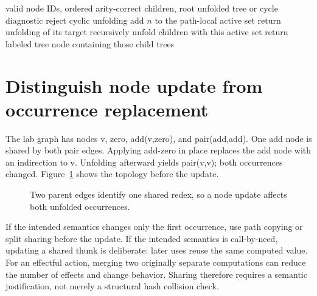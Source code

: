 \begin{algorithm}[htbp]
\caption{Read back a finite acyclic term graph, rejecting cyclic tree unfolding.}
\label{alg:ch86-unfold}
\begin{pseudocode}
\Require valid node IDs, ordered arity-correct children, root
\Ensure unfolded tree or cycle diagnostic
 \State reject cyclic unfolding \EndIf
\State add $n$ to the path-local active set
 \State return unfolding of its target \EndIf
\State recursively unfold children with this active set
\State return labeled tree node containing those child trees
\EndFunction
\end{pseudocode}
\end{algorithm}

\section{Distinguish node update from occurrence replacement}
\label{sec:ch86-update}
The lab graph has nodes v, zero, add(v,zero), and pair(add,add).
One add node is shared by both pair edges.
Applying add-zero in place replaces the add node with an indirection to v.
Unfolding afterward yields pair(v,v); both occurrences changed.
Figure~\ref{fig:ch86-sharing} shows the topology before the update.

\begin{figure}[htbp]
\centering
{}
\caption{Two parent edges identify one shared redex, so a node update affects both unfolded occurrences.}
\label{fig:ch86-sharing}
\end{figure}

If the intended semantics changes only the first occurrence, use path copying or split sharing before the update.
If the intended semantics is call-by-need, updating a shared thunk is deliberate: later uses reuse the same computed value.
For an effectful action, merging two originally separate computations can reduce the number of effects and change behavior.
Sharing therefore requires a semantic justification, not merely a structural hash collision check.

